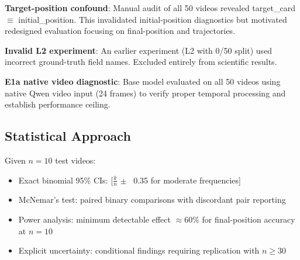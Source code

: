 \textbf{Target-position confound}: Manual audit of all 50 videos revealed target\_card $\equiv$ initial\_position. This invalidated initial-position diagnostics but motivated redesigned evaluation focusing on final-position and trajectories.

\textbf{Invalid L2 experiment}: An earlier experiment (L2 with 0/50 split) used incorrect ground-truth field names. Excluded entirely from scientific results.

\textbf{E1a native video diagnostic}: Base model evaluated on all 50 videos using native Qwen video input (24 frames) to verify proper temporal processing and establish performance ceiling.

\subsection{Statistical Approach}

Given $n=10$ test videos:
\begin{itemize}
    \item Exact binomial 95\% CIs: [$\frac{k}{n}$ $\pm$ ~0.35 for moderate frequencies]
    \item McNemar's test: paired binary comparisons with discordant pair reporting
    \item Power analysis: minimum detectable effect $\approx 60\%$ for final-position accuracy at $n=10$
    \item Explicit uncertainty: conditional findings requiring replication with $n \geq 30$
\end{itemize}
